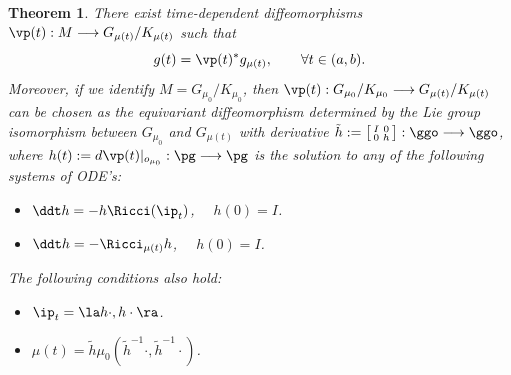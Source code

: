 \documentclass[11pt]{amsart}
\theoremstyle{plain}
\newtheorem{theorem}{Theorem}[section]
\theoremstyle{definition}
\theoremstyle{remark}
\begin{document}
\begin{theorem}\label{eqfl}
There exist time-dependent diffeomorphisms $\vp(t):M\longrightarrow G_{\mu(t)}/K_{\mu(t)}$ such that
$$
g(t)=\vp(t)^*g_{\mu(t)}, \qquad\forall t\in (a,b).
$$
Moreover, if we identify $M=G_{\mu_0}/K_{\mu_0}$, then $\vp(t):G_{\mu_0}/K_{\mu_0}\longrightarrow G_{\mu(t)}/K_{\mu(t)}$ can be chosen as the equivariant diffeomorphism determined by the Lie group isomorphism between $G_{\mu_0}$ and $G_{\mu(t)}$ with derivative $\tilde{h}:=\left[\begin{smallmatrix} I&0\\ 0&h \end{smallmatrix}\right]:\ggo\longrightarrow\ggo$, where $h(t):=d\vp(t)|_{o_{\mu_0}}:\pg\longrightarrow\pg$ is the solution to any of the following systems of ODE's:

\begin{itemize}
\item[(i)] $\ddt h=-h\Ricci(\ip_t)$, $\quad h(0)=I$.

\item[(ii)] $\ddt h=-\Ricci_{\mu(t)}h$, $\quad h(0)=I$.
\end{itemize}
The following conditions also hold:
\begin{itemize}
\item[(iii)] $\ip_t=\la h\cdot,h\cdot\ra$.

\item[(iv)] $\mu(t)=\tilde{h}\mu_0(\tilde{h}^{-1}\cdot,\tilde{h}^{-1}\cdot)$.
\end{itemize}
\end{theorem}
\end{document}
